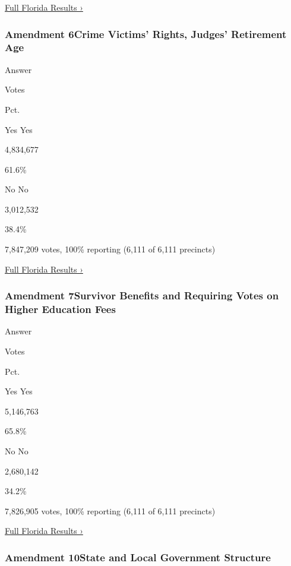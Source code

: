 \href{https://www.nytimes3xbfgragh.onion/interactive/2018/11/06/us/elections/results-florida-elections.html}{Full
Florida Results ›}

\hypertarget{amendment-6crime-victims-rights-judges-retirement-age}{%
\subsubsection{Amendment 6Crime Victims' Rights, Judges' Retirement
Age}\label{amendment-6crime-victims-rights-judges-retirement-age}}

Answer

Votes

Pct.

 Yes Yes

4,834,677

61.6\%

 No No

3,012,532

38.4\%

7,847,209 votes, 100\% reporting (6,111 of 6,111 precincts)

\href{https://www.nytimes3xbfgragh.onion/interactive/2018/11/06/us/elections/results-florida-elections.html}{Full
Florida Results ›}

\hypertarget{amendment-7survivor-benefits-and-requiring-votes-on-higher-education-fees}{%
\subsubsection{Amendment 7Survivor Benefits and Requiring Votes on
Higher Education
Fees}\label{amendment-7survivor-benefits-and-requiring-votes-on-higher-education-fees}}

Answer

Votes

Pct.

 Yes Yes

5,146,763

65.8\%

 No No

2,680,142

34.2\%

7,826,905 votes, 100\% reporting (6,111 of 6,111 precincts)

\href{https://www.nytimes3xbfgragh.onion/interactive/2018/11/06/us/elections/results-florida-elections.html}{Full
Florida Results ›}

\hypertarget{amendment-10state-and-local-government-structure}{%
\subsubsection{Amendment 10State and Local Government
Structure}\label{amendment-10state-and-local-government-structure}}

